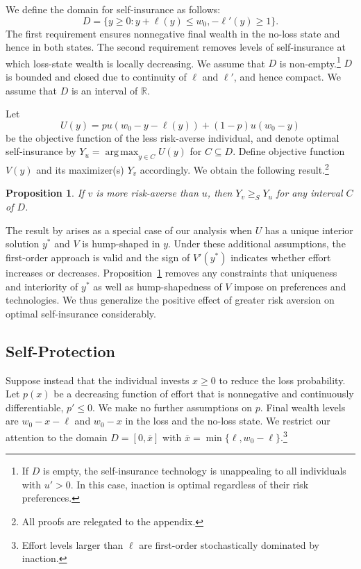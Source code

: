 \documentclass[11pt]{article}
\newtheorem{proposition}[theorem]{Proposition}
\DeclareMathOperator*{\argmax}{arg\,max}
\newcommand{\ol}{\overline}
\begin{document}
We define the domain for self-insurance as follows:
	$$ D = \{y \geq 0: y+\ell(y)\leq w_0, -\ell'(y) \geq 1\}. $$
The first requirement ensures nonnegative final wealth in the no-loss state and hence in both states. The second requirement removes levels of self-insurance at which loss-state wealth is locally decreasing. We assume that $D$ is non-empty.\footnote{If $D$ is empty, the self-insurance technology is unappealing to all individuals with $u'>0$. In this case, inaction is optimal regardless of their risk preferences.} $D$ is bounded and closed due to continuity of $\ell$ and $\ell'$, and hence compact. We assume that $D$ is an interval of $\mathbb{R}$.

Let
	$$ U(y) = pu(w_0-y-\ell(y)) + (1-p)u(w_0-y) $$
be the objective function of the less risk-averse individual, and denote optimal self-insurance by $Y_u = \argmax_{y \in C} U(y)$ for $C \subseteq D$. Define objective function $V(y)$ and its maximizer(s) $Y_v$ accordingly. We obtain the following result.\footnote{All proofs are relegated to the appendix.} 

\begin{proposition}\label{prop:SI}
	If $v$ is more risk-averse than $u$, then $Y_v \geq_S Y_u$ for any interval $C$ of $D$.
\end{proposition}

The result by \cite{dionne1985self} arises as a special case of our analysis when $U$ has a unique interior solution $y^*$ and $V$ is hump-shaped in $y$. Under these additional assumptions, the first-order approach is valid and the sign of $V'(y^*)$ indicates whether effort increases or decreases. Proposition~\ref{prop:SI} removes any constraints that uniqueness and interiority of $y^*$ as well as hump-shapedness of $V$ impose on preferences and technologies. We thus generalize the positive effect of greater risk aversion on optimal self-insurance considerably.

\subsection{Self-Protection}

Suppose instead that the individual invests $x \geq 0$ to reduce the loss probability. Let $p(x)$ be a decreasing function of effort that is nonnegative and continuously differentiable, $p' \leq 0$. We make no further assumptions on $p$. Final wealth levels are $w_0-x-\ell$ and $w_0-x$ in the loss and the no-loss state. We restrict our attention to the domain $D=[0,\ol{x}]$ with $\ol{x}=\min\{\ell,w_0-\ell\}$.\footnote{Effort levels larger than $\ell$ are first-order stochastically dominated by inaction.}
\end{document}
